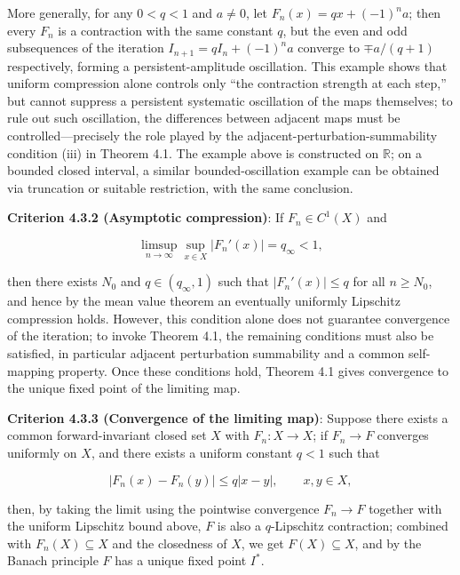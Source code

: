 \documentclass[11pt,a4paper]{amsart}
\begin{document}
More generally, for any $0 < q < 1$ and $a \ne 0$, let $F_n(x) = qx + (-1)^n a$; then every $F_n$ is a contraction with the same constant $q$, but the even and odd subsequences of the iteration $I_{n+1} = qI_n + (-1)^n a$ converge to $\mp a/(q+1)$ respectively, forming a persistent-amplitude oscillation. This example shows that uniform compression alone controls only ``the contraction strength at each step,'' but cannot suppress a persistent systematic oscillation of the maps themselves; to rule out such oscillation, the differences between adjacent maps must be controlled---precisely the role played by the adjacent-perturbation-summability condition (iii) in Theorem 4.1. The example above is constructed on $\mathbb{R}$; on a bounded closed interval, a similar bounded-oscillation example can be obtained via truncation or suitable restriction, with the same conclusion.

\textbf{Criterion 4.3.2 (Asymptotic compression)}: If $F_n \in C^1(X)$ and

\begin{equation}
\label{eq:q-infty}
\limsup_{n\to\infty} \sup_{x\in X}|F_n'(x)| = q_\infty < 1,
\end{equation}

then there exists $N_0$ and $q \in (q_\infty, 1)$ such that $|F_n'(x)| \le q$ for all $n \ge N_0$, and hence by the mean value theorem an eventually uniformly Lipschitz compression holds. However, this condition alone does not guarantee convergence of the iteration; to invoke Theorem 4.1, the remaining conditions must also be satisfied, in particular adjacent perturbation summability and a common self-mapping property. Once these conditions hold, Theorem 4.1 gives convergence to the unique fixed point of the limiting map.

\textbf{Criterion 4.3.3 (Convergence of the limiting map)}: Suppose there exists a common forward-invariant closed set $X$ with $F_n: X \to X$; if $F_n \to F$ converges uniformly on $X$, and there exists a uniform constant $q < 1$ such that

\begin{equation}
|F_n(x) - F_n(y)| \le q|x - y|, \qquad x, y \in X,
\end{equation}

then, by taking the limit using the pointwise convergence $F_n \to F$ together with the uniform Lipschitz bound above, $F$ is also a $q$-Lipschitz contraction; combined with $F_n(X) \subseteq X$ and the closedness of $X$, we get $F(X) \subseteq X$, and by the Banach principle $F$ has a unique fixed point $I^*$.
\end{document}
